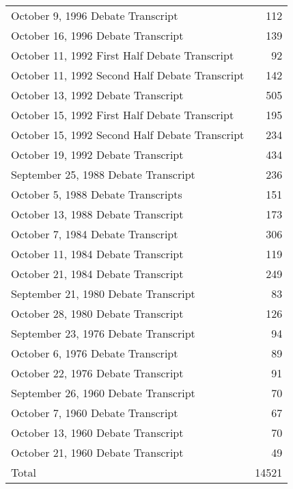 \begin{longtable}{lr}
October 9, 1996 Debate Transcript & 112 \\
October 16, 1996 Debate Transcript & 139 \\
October 11, 1992 First Half Debate Transcript & 92 \\
October 11, 1992 Second Half Debate Transcript & 142 \\
October 13, 1992 Debate Transcript & 505 \\
October 15, 1992 First Half Debate Transcript & 195 \\
October 15, 1992 Second Half Debate Transcript & 234 \\
October 19, 1992 Debate Transcript & 434 \\
September 25, 1988 Debate Transcript & 236 \\
October 5, 1988 Debate Transcripts & 151 \\
October 13, 1988 Debate Transcript & 173 \\
October 7, 1984 Debate Transcript & 306 \\
October 11, 1984 Debate Transcript & 119 \\
October 21, 1984 Debate Transcript & 249 \\
September 21, 1980 Debate Transcript & 83 \\
October 28, 1980 Debate Transcript & 126 \\
September 23, 1976 Debate Transcript & 94 \\
October 6, 1976 Debate Transcript & 89 \\
October 22, 1976 Debate Transcript & 91 \\
September 26, 1960 Debate Transcript & 70 \\
October 7, 1960 Debate Transcript & 67 \\
October 13, 1960 Debate Transcript & 70 \\
October 21, 1960 Debate Transcript & 49 \\
Total & 14521 \\
\end{longtable}
